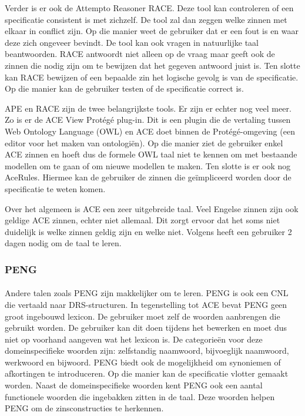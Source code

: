 \documentclass[]{article}
\theoremstyle{definition}
\begin{document}
Verder is er ook de Attempto Reasoner RACE. Deze tool kan controleren of een specificatie consistent is met zichzelf. De tool zal dan zeggen welke zinnen met elkaar in conflict zijn. Op die manier weet de gebruiker dat er een fout is en waar deze zich ongeveer bevindt. De tool kan ook vragen in natuurlijke taal beantwoorden. RACE antwoordt niet alleen op de vraag maar geeft ook de zinnen die nodig zijn om te bewijzen dat het gegeven antwoord juist is. Ten slotte kan RACE bewijzen of een bepaalde zin het logische gevolg is van de specificatie. Op die manier kan de gebruiker testen of de specificatie correct is.

APE en RACE zijn de twee belangrijkste tools. Er zijn er echter nog veel meer. Zo is er de ACE View Protégé plug-in. Dit is een plugin die de vertaling tussen Web Ontology Language (OWL) en ACE doet binnen de Protégé-omgeving (een editor voor het maken van ontologiën). Op die manier ziet de gebruiker enkel ACE zinnen en hoeft dus de formele OWL taal niet te kennen om met bestaande modellen om te gaan of om nieuwe modellen te maken. Ten slotte is er ook nog AceRules. Hiermee kan de gebruiker de zinnen die geïmpliceerd worden door de specificatie te weten komen.

Over het algemeen is ACE een zeer uitgebreide taal. Veel Engelse zinnen zijn ook geldige ACE zinnen, echter niet allemaal. Dit zorgt ervoor dat het soms niet duidelijk is welke zinnen geldig zijn en welke niet. Volgens \cite{Fuchs2008} heeft een gebruiker 2 dagen nodig om de taal te leren.

\subsubsection{PENG}
\paragraph{} Andere talen zoals PENG\cite{Schwitter2002} zijn makkelijker om te leren. PENG is ook een CNL die vertaald naar DRS-structuren. In tegenstelling tot ACE bevat PENG geen groot ingebouwd lexicon. De gebruiker moet zelf de woorden aanbrengen die gebruikt worden. De gebruiker kan dit doen tijdens het bewerken en moet dus niet op voorhand aangeven wat het lexicon is. De categorieën voor deze domeinspecifieke woorden zijn: zelfstandig naamwoord, bijvoeglijk naamwoord, werkwoord en bijwoord. PENG biedt ook de mogelijkheid om synoniemen of afkortingen te introduceren. Op die manier kan de specificatie vlotter gemaakt worden. Naast de domeinspecifieke woorden kent PENG ook een aantal functionele woorden die ingebakken zitten in de taal. Deze woorden helpen PENG om de zinsconstructies te herkennen.
\end{document}
